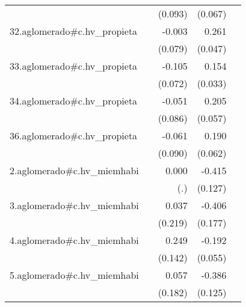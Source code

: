 {\begin{longtable}{l*{4}{D{.}{.}{-1}}}
            &                     &     (0.093)         &     (0.067)         &                     \\
\addlinespace
32.aglomerado#c.hv\_propieta&                     &      -0.003         &       0.261\sym{***}&                     \\
            &                     &     (0.079)         &     (0.047)         &                     \\
\addlinespace
33.aglomerado#c.hv\_propieta&                     &      -0.105         &       0.154\sym{***}&                     \\
            &                     &     (0.072)         &     (0.033)         &                     \\
\addlinespace
34.aglomerado#c.hv\_propieta&                     &      -0.051         &       0.205\sym{***}&                     \\
            &                     &     (0.086)         &     (0.057)         &                     \\
\addlinespace
36.aglomerado#c.hv\_propieta&                     &      -0.061         &       0.190\sym{**} &                     \\
            &                     &     (0.090)         &     (0.062)         &                     \\
\addlinespace
2.aglomerado#c.hv\_miemhabi&                     &       0.000         &      -0.415\sym{**} &                     \\
            &                     &         (.)         &     (0.127)         &                     \\
\addlinespace
3.aglomerado#c.hv\_miemhabi&                     &       0.037         &      -0.406\sym{*}  &                     \\
            &                     &     (0.219)         &     (0.177)         &                     \\
\addlinespace
4.aglomerado#c.hv\_miemhabi&                     &       0.249         &      -0.192\sym{***}&                     \\
            &                     &     (0.142)         &     (0.055)         &                     \\
\addlinespace
5.aglomerado#c.hv\_miemhabi&                     &       0.057         &      -0.386\sym{**} &                     \\
            &                     &     (0.182)         &     (0.125)         &                     \\

\end{longtable}}
